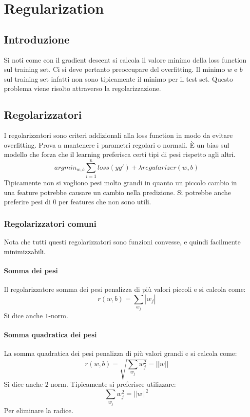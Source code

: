 \chapter{Regularization}

\section{Introduzione}
Si noti come con il gradient descent si calcola il valore minimo della loss function sul training set.
Ci si deve pertanto preoccupare del overfitting.
Il minimo $w$ e $b$ sul training set infatti non sono tipicamente il minimo per il test set.
Questo problema viene risolto attraverso la regolarizzazione.

\section{Regolarizzatori}
I regolarizzatori sono criteri addizionali alla loss function in modo da evitare overfitting.
Prova a mantenere i parametri regolari o normali.
\`E un bias sul modello che forza che il learning preferisca certi tipi di pesi rispetto agli altri.
$$argmin_{w,b}\sum\limits_{i=1}^nloss(yy')+\lambda regularizer(w,b)$$
Tipicamente non si vogliono pesi molto grandi in quanto un piccolo cambio in una feature potrebbe causare un cambio nella predizione.
Si potrebbe anche preferire pesi di $0$ per features che non sono utili.

	\subsection{Regolarizzatori comuni}
	Nota che tutti questi regolarizzatori sono funzioni convesse, e quindi facilmente minimizzabili.
		\subsubsection{Somma dei pesi}
		Il regolarizzatore somma dei pesi penalizza di pi\`u valori piccoli e si calcola come:
		$$r(w,b)=\sum\limits_{w_j}|w_j|$$
		Si dice anche $1$-norm.
		
		\subsubsection{Somma quadratica dei pesi}
		La somma quadratica dei pesi penalizza di pi\`u valori grandi e si calcola come:
		$$r(w,b)=\sqrt{\sum\limits_{w_j}w_j^2} =||w||$$
		Si dice anche $2$-norm. 
		Tipicamente si preferisce utilizzare:
		$$\sum\limits_{w_j}w_j^2 =||w||^2$$
		Per eliminare la radice.
		
